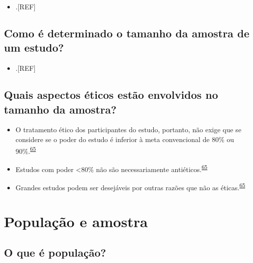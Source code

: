 \documentclass[
]{book}
\providecommand{\tightlist}{%
  \setlength{\itemsep}{0pt}\setlength{\parskip}{0pt}}
\begin{document}
\begin{itemize}
\tightlist
\item
  .{[}REF{]}
\end{itemize}

\hypertarget{como-uxe9-determinado-o-tamanho-da-amostra-de-um-estudo}{%
\subsection{Como é determinado o tamanho da amostra de um estudo?}\label{como-uxe9-determinado-o-tamanho-da-amostra-de-um-estudo}}

\begin{itemize}
\tightlist
\item
  .{[}REF{]}
\end{itemize}

\hypertarget{quais-aspectos-uxe9ticos-estuxe3o-envolvidos-no-tamanho-da-amostra}{%
\subsection{Quais aspectos éticos estão envolvidos no tamanho da amostra?}\label{quais-aspectos-uxe9ticos-estuxe3o-envolvidos-no-tamanho-da-amostra}}

\begin{itemize}
\item
  O tratamento ético dos participantes do estudo, portanto, não exige que se considere se o poder do estudo é inferior à meta convencional de 80\% ou 90\%.\textsuperscript{\protect\hyperlink{ref-Bacchetti2005}{65}}
\item
  Estudos com poder \textless80\% não são necessariamente antiéticos.\textsuperscript{\protect\hyperlink{ref-Bacchetti2005}{65}}
\item
  Grandes estudos podem ser desejáveis por outras razões que não as éticas.\textsuperscript{\protect\hyperlink{ref-Bacchetti2005}{65}}
\end{itemize}

\hypertarget{populacao-amostra}{%
\section{População e amostra}\label{populacao-amostra}}

\hypertarget{o-que-uxe9-populauxe7uxe3o}{%
\subsection{O que é população?}\label{o-que-uxe9-populauxe7uxe3o}}
\end{document}
